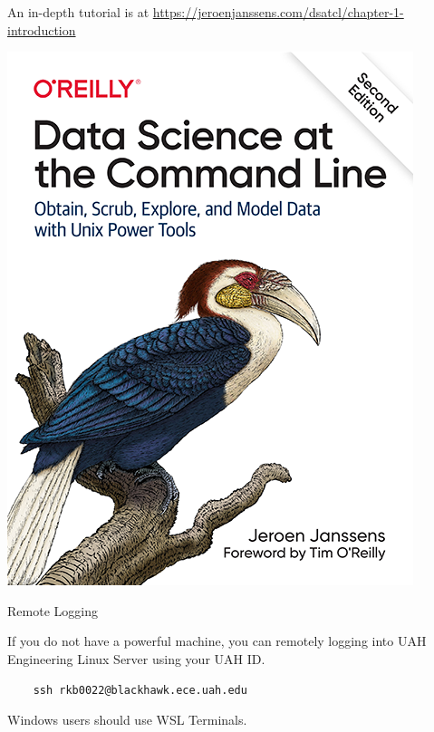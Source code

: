 \documentclass[aspectratio=169,xcolor=dvipsnames,svgnames,x11names,fleqn]{beamer}
\begin{document}
\begin{frame}
    
    \begin{center}
        An in-depth tutorial is at \url{https://jeroenjanssens.com/dsatcl/chapter-1-introduction}

        \includegraphics[width=\textwidth,height=0.75\textheight,keepaspectratio]{figures/ds_cmdline.png}

    \end{center}
\end{frame}

\begin{frame}[containsverbatim]{Remote Logging}
    
    If you do not have a powerful machine, you can remotely logging into UAH Engineering Linux Server using your UAH ID.

    \begin{verbatim}
    ssh rkb0022@blackhawk.ece.uah.edu
    \end{verbatim}

    Windows users should use WSL Terminals.

\end{frame}
\end{document}
